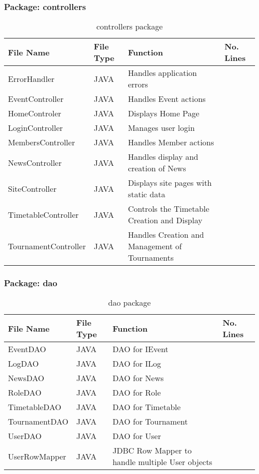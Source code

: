 \subsubsection{Package: controllers}
\begin{table}[H]
\begin{center}
    \begin{tabular}{| l | l | l| p{1cm} |}
    \hline
    File Name & File Type & Function & No. Lines\\ \hline
    ErrorHandler & JAVA & Handles application errors \\ \hline
	EventController & JAVA & Handles Event actions \\ \hline
	HomeControler & JAVA & Displays Home Page \\ \hline
	LoginController & JAVA & Manages user login \\ \hline
	MembersController & JAVA & Handles Member actions \\ \hline
	NewsController & JAVA & Handles display and creation of News \\ \hline
	SiteController & JAVA & Displays site pages with static data \\ \hline
	TimetableController & JAVA & Controls the Timetable Creation and Display \\ \hline
	TournamentController & JAVA & Handles Creation and Management of Tournaments \\ \hline
    \end{tabular}
\end{center}
\caption{controllers package}
\end{table}

\subsubsection{Package: dao}
\begin{table}[H]
\begin{center}
    \begin{tabular}{| l | l | l| p{1cm} |}
    \hline
    File Name & File Type & Function & No. Lines\\ \hline
    EventDAO & JAVA & DAO for IEvent\\ \hline
	LogDAO & JAVA & DAO for ILog\\ \hline
	NewsDAO & JAVA & DAO for News\\ \hline
	RoleDAO & JAVA & DAO for Role\\ \hline
	TimetableDAO & JAVA & DAO for Timetable\\ \hline
	TournamentDAO & JAVA & DAO for Tournament\\ \hline
	UserDAO & JAVA & DAO for User\\ \hline
	UserRowMapper & JAVA & JDBC Row Mapper to handle multiple User objects \\ \hline	
    \end{tabular}
\end{center}
\caption{dao package}
\end{table}

